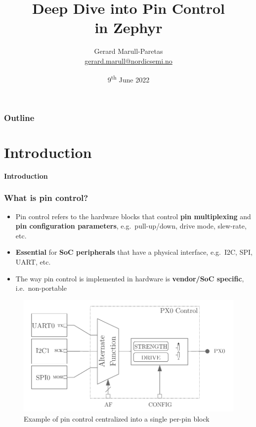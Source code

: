 \documentclass[handout]{beamer}
\title{Deep Dive into Pin Control\\in Zephyr}
\author{
  \texorpdfstring{
    Gerard Marull-Paretas\\
    \href{mailto:gerard.marull@nordicsemi.no}{gerard.marull@nordicsemi.no}
  }{Gerard Marull-Paretas}
}
\institute{Nordic Semiconductor ASA}
\date{9\textsuperscript{th} June 2022}
\begin{document}

\begin{frame}[plain]
  \titlepage{}
\end{frame}

\begin{frame}
  \frametitle{Outline}
  \tableofcontents
\end{frame}


\section{Introduction}

\begin{frame}
  \begin{center}
    \Huge \textbf{Introduction}
  \end{center}
\end{frame}

\begin{frame}
  \frametitle{What is pin control?}

  \begin{itemize}
    \item<1-> Pin control refers to the hardware blocks that control
          \textbf{pin multiplexing} and \textbf{pin configuration parameters},
          e.g.\ pull-up/down, drive mode, slew-rate, etc.
    \item<2-> \textbf{Essential} for \textbf{SoC peripherals} that have a
          physical interface, e.g.\ I2C, SPI, UART, etc.
    \item<3-> The way pin control is implemented in hardware is
          \textbf{vendor/SoC specific}, i.e.\ non-portable
  \end{itemize}

  \begin{figure}
    \centering
    \includegraphics[scale=0.4]{hw-cent-control}
    \caption{Example of pin control centralized into a single per-pin block}
  \end{figure}
\end{frame}
\end{document}
